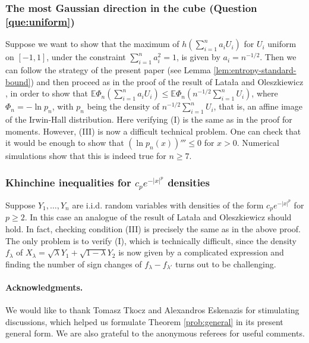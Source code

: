 \documentclass[11pt]{amsart}
\newcommand{\1}{\mathbf{1}}
\newcommand{\E}{\mathbb{E}}
\theoremstyle{definition}
\theoremstyle{definition}
\theoremstyle{remark}
\begin{document}
\subsubsection{The most Gaussian direction in the cube (Question \ref{que:uniform})} 
Suppose we want to show that the maximum of $h(\sum_{i=1}^n a_i U_i)$ for $U_i$ uniform on $[-1,1]$, under the constraint $\sum_{i=1}^n a_i^2=1$, is given by $a_i=n^{-1/2}$. Then we can follow the strategy of the present paper (see Lemma \ref{lem:entropy-standard-bound}) and then proceed as in the proof of the result of Lata{\l}a and Oleszkiewicz \cite{L06}, in order to show that $\E \Phi_n(\sum_{i=1}^n a_i U_i) \leq \E \Phi_n(n^{-1/2}\sum_{i=1}^n U_i)$, where $\Phi_n= -\ln p_n$, with $p_n$ being the density of $n^{-1/2} \sum_{i=1}^n U_i$, that is, an affine image of the Irwin-Hall distribution. Here verifying (I) is the same as in the proof for moments. However, (III) is now a difficult technical problem. One can check that it would be enough to show that $(\ln p_n(x))'''\leq 0$ for $x>0$. Numerical simulations show that this is indeed true for $n \geq 7$.    




\subsubsection{Khinchine inequalities for $c_p e^{-|x|^p}$ densities} 
Suppose $Y_1,\ldots, Y_n$ are i.i.d. random variables with densities of the form $c_pe^{-|x|^p}$ for $p \geq 2$. In this case an analogue of the result of Lata{\l}a and Oleszkiewicz should hold. In fact, checking condition (III) is precisely the same as in the above proof. The only  problem is to verify (I), which is  technically difficult, since the density $f_\lambda$ of $X_\lambda = \sqrt{\lambda} Y_1 + \sqrt{1-\lambda} Y_2$ is now given by a complicated expression and finding the number of sign changes of $f_\lambda - f_{\lambda'}$ turns out to be challenging.   
 


\vspace{0.5cm} 

\paragraph{\textbf{Acknowledgments.}} We would like to thank Tomasz Tkocz and Alexandros Eskenazis for stimulating discussions, which helped us formulate Theorem \ref{prob:general} in its present general form. We are also grateful to the anonymous referees for useful comments. 
\end{document}
